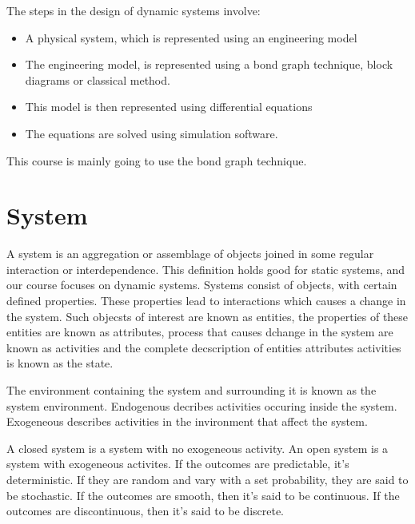 \documentclass[twoside]{report}
\begin{document}
The steps in the design of dynamic systems involve:
\begin{itemize}
	\item A physical system, which is represented using an engineering model
	\item The engineering model, is represented using a bond graph technique, block diagrams or classical method.
	\item This model is then represented using differential equations
	\item The equations are solved using simulation software.
\end{itemize}

This course is mainly going to use the bond graph technique.
\section{System}
A system is an aggregation or assemblage of objects joined in some regular interaction or interdependence. This definition holds good for static systems, and our course focuses on dynamic systems. Systems consist of objects, with certain defined properties. These properties lead to interactions which causes a change in the system. Such objecsts of interest are known as entities, the properties of these entities are known as attributes, process that causes dchange in the system are known as activities and the complete decscription of entities attributes activities is known as the state.

The environment containing the system and surrounding it is known as the system environment. Endogenous decribes activities occuring inside the system. Exogeneous describes activities in the invironment that affect the system.

A closed system is a system with no exogeneous activity. An open system is a system with exogeneous activites. If the outcomes are predictable, it's deterministic. If they are random and vary with a set probability, they are said to be stochastic. If the outcomes  are smooth, then it's said to be continuous. If the outcomes  are discontinuous, then it's said to be discrete.
\end{document}

